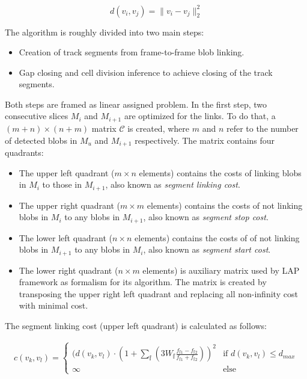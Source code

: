 \documentclass[pdftex,12pt,a4paper]{report}
\begin{document}
\begin{equation}
d(v_i, v_j) = \| v_i - v_j\|^2_2
\label{eq:particle_cost_function}
\end{equation}

The algorithm is roughly divided into two main steps:

\begin{itemize}
\item  Creation of track segments from frame-to-frame blob linking.
\item  Gap closing and cell division inference to achieve closing of the track segments.
\end{itemize}

Both steps are framed as linear assigned problem. In the first step, two consecutive slices $M_i$  and $M_{i+1}$ are optimized for the links. To do that, a $(m + n) \times (n + m)$ matrix $\mathcal{C}$ is created, where $m$ and $n$ refer to the number of detected blobs in $M_u$ and $M_{i + 1}$ respectively. The matrix contains four quadrants:

\begin{itemize}
\item The upper left quadrant ($m \times n$ elements) contains the costs of linking blobs in $M_i$ to those in $M_{i + 1}$, also known as \textit{segment linking cost}.
\item The upper right quadrant ($m \times m$ elements) contains the costs of not linking blobs in $M_i$ to any blobs in $M_{i + 1}$, also known as \textit{segment stop cost}.
\item The lower left quadrant ($n \times n$ elements) contains the costs of of not linking blobs in $M_{i + 1}$ to any blobs in $M_i$, also known as \textit{segment start cost}.
\item The lower right quadrant ($n \times m$ elements) is auxiliary matrix used by LAP framework as formalism for its algorithm. The matrix is created by transposing the upper right left quadrant and replacing all non-infinity cost with minimal cost. 
\end{itemize}

The segment linking cost (upper left quadrant) is calculated as follows:

\begin{gather*}
c(v_k, v_l) =
\begin{cases}
  (d(v_k, v_l) \cdot \left(1 + \sum_{\mathbb{f}} \left(3 W_{\mathbb{f}} \frac{ f_{\mathbb{f}1} - f_{\mathbb{f}2} }{f_{\mathbb{f}1} + f_{\mathbb{f}2}} \right)\right)^2 & \text{if } d(v_k, v_l) \leq d_{max} \\    
  \infty & \text{else}  
\end{cases}
\end{gather*}
\end{document}
